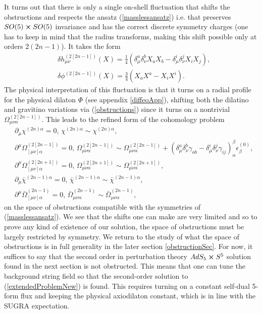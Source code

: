 \documentclass[12pt]{article}
\def\be{\begin{equation}}
\def\ee{\end{equation}}
\numberwithin{equation}{section}
\begin{document}
It turns out that there is only a single on-shell fluctuation that shifts the obstructions and respects the ansatz (\ref{masslessansatz}) i.e. that preserves $SO(5) \cross SO(5)$ invariance and has the correct discrete symmetry charges (one has to keep in mind that the radius transforms, making this shift possible only at orders $2(2n-1)$). It takes the form
\be
\begin{aligned}
&\delta h_{\mu\nu}^{(2[2n-1])}(X)=\frac{1}{4}(\delta_{\mu}^a\delta_{\nu}^bX_aX_b-\delta_{\mu}^i\delta_{\nu}^jX_iX_j),\\
&\delta \phi^{(2[2n-1])}(X)=\frac{3}{4} (X_a X^a - X_i X^i).
\label{osshift}
\end{aligned}
\ee
The physical interpretation of this fluctuation is that it turns on a radial profile for the physical dilaton $\Phi$ (see appendix \ref{diffeoApp}), shifting both the dilatino and gravitino variations via (\ref{obstructions}) since it turns on a nontrivial $\Omega_{\mu \nu \alpha}^{(2[2n-1])}$.
This leads to the refined form of the cohomology problem
\be
\begin{aligned}
\label{shifts}
&\partial_\mu \chi^{{(2n)}\alpha} = 0, \, \chi^{(2n)\alpha} \sim \chi^{{(2n)}\alpha} ,\\
& \partial^\mu \Omega_{[\mu \nu] \alpha}^{(2[2n-1])} = 0, \, \Omega_{\mu \nu \alpha}^{(2[2n-1])} \sim \Omega_{\mu \nu \alpha} ^{(2[2n-1])}+ (\delta_{\mu}^a\delta_{\nu}^b\gamma_{ab}-\delta_{\mu}^i\delta_{\nu}^j\gamma_{ij})_\alpha^\beta\epsilon^{(0)}_\beta, \\
& \partial^\mu \Omega_{[\mu \nu] \alpha}^{(2[2n+1])} = 0, \, \Omega_{\mu \nu \alpha}^{(2[2n+1])} \sim \Omega_{\mu \nu \alpha} ^{(2[2n+1])},\\
& \partial_\mu \bar{\chi}^{{(2n-1)}\alpha} = 0, \, \bar{\chi}^{(2n-1)\alpha} \sim \bar{\chi}^{{(2n-1)}\alpha},\\
&\partial^\mu \bar{\Omega}_{[\mu \nu] \alpha} ^{(2n-1)}= 0, \, \bar{\Omega}_{\mu \nu \alpha} ^{(2n-1)}\sim \bar{\Omega}_{\mu \nu \alpha}^{(2n-1)},
\end{aligned}
\ee
on the space of obstructions compatible with the symmetries of (\ref{masslessansatz}). We see that the shifts one can make are very limited and so to prove any kind of existence of our solution, the space of obstructions must be largely restricted by symmetry. We return to the study of what the space of obstructions is in full generality in the later section \ref{obstructionSec}. For now, it suffices to say that the second order in perturbation theory $AdS_5 \cross S^5$ solution found in the next section is not obstructed. This means that one can tune the background string field so that the second-order solution to (\ref{extendedProblemNew}) is found. This requires turning on a constant self-dual 5-form flux and keeping the physical axiodilaton constant, which is in line with the SUGRA expectation.
\end{document}
